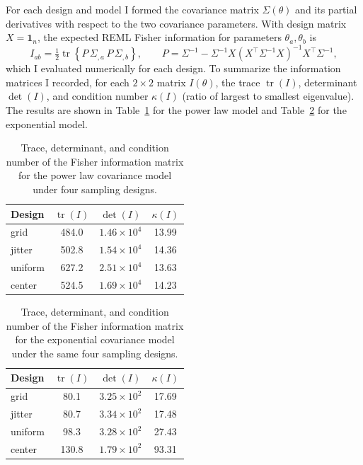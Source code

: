 \documentclass[answers,12pt,addpoints]{exam}
\begin{document}
\begin{questions}
\begin{solution}
For each design and model I formed the covariance matrix
$\Sigma(\theta)$ and its partial derivatives with respect to the two
covariance parameters.  With design matrix $X=\mathbf{1}_n$, the
expected REML Fisher information for parameters $\theta_a,\theta_b$ is
\[
I_{ab}
= \tfrac{1}{2} \operatorname{tr}\!\left\{
P\,\Sigma_{,a}\,P\,\Sigma_{,b}\right\},\qquad
P = \Sigma^{-1} - \Sigma^{-1} X
       (X^\top \Sigma^{-1} X)^{-1} X^\top \Sigma^{-1},
\]
which I evaluated numerically for each design.
To summarize the information matrices I recorded, for each
$2\times2$ matrix $I(\theta)$, the trace
$\operatorname{tr}(I)$, determinant $\det(I)$, and condition number
$\kappa(I)$ (ratio of largest to smallest eigenvalue).  The results
are shown in Table~\ref{tab:fisher_power} for the power law model and
Table~\ref{tab:fisher_exp} for the exponential model.
\end{solution}

\begin{table}[ht]
\centering
\begin{tabular}{lccc}
\hline
Design & $\operatorname{tr}(I)$ & $\det(I)$ &
$\kappa(I)$ \\
\hline
grid    & 484.0 & $1.46\times 10^{4}$ & 13.99 \\
jitter  & 502.8 & $1.54\times 10^{4}$ & 14.36 \\
uniform & 627.2 & $2.51\times 10^{4}$ & 13.63 \\
center  & 524.5 & $1.69\times 10^{4}$ & 14.23 \\
\hline
\end{tabular}
\caption{Trace, determinant, and condition number of the Fisher
information matrix for the power law covariance model under four
sampling designs.}
\label{tab:fisher_power}
\end{table}

\begin{table}[ht]
\centering
\begin{tabular}{lccc}
\hline
Design & $\operatorname{tr}(I)$ & $\det(I)$ &
$\kappa(I)$ \\
\hline
grid    & 80.1  & $3.25\times 10^{2}$ & 17.69 \\
jitter  & 80.7  & $3.34\times 10^{2}$ & 17.48 \\
uniform & 98.3  & $3.28\times 10^{2}$ & 27.43 \\
center  & 130.8 & $1.79\times 10^{2}$ & 93.31 \\
\hline
\end{tabular}
\caption{Trace, determinant, and condition number of the Fisher
information matrix for the exponential covariance model under the same
four sampling designs.}
\label{tab:fisher_exp}
\end{table}


\end{questions}
\end{document}
